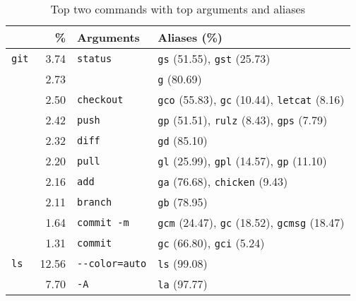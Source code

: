 \newcommand{\numx}[1]{{\small (\num{#1})}}
\begin{table}
    \caption{Top two commands with top arguments and aliases}
    \label{tab:command-summary}
    \begin{tabular}{@{}lrll@{}}
        \toprule
                       &           \% &           Arguments &                                                                    Aliases (\%) \\
        \midrule
            \verb|git| &   \num{3.74} &       \verb|status| &                               \verb|gs| \numx{51.55}, \verb|gst| \numx{25.73} \\
                       &   \num{2.73} &             \verb|| &                                                          \verb|g| \numx{80.69} \\
                       &   \num{2.50} &     \verb|checkout| &   \verb|gco| \numx{55.83}, \verb|gc| \numx{10.44}, \verb|letcat| \numx{8.16} \\
                       &   \num{2.42} &         \verb|push| &      \verb|gp| \numx{51.51}, \verb|rulz| \numx{8.43}, \verb|gps| \numx{7.79} \\
                       &   \num{2.32} &         \verb|diff| &                                                         \verb|gd| \numx{85.10} \\
                       &   \num{2.20} &         \verb|pull| &      \verb|gl| \numx{25.99}, \verb|gpl| \numx{14.57}, \verb|gp| \numx{11.10} \\
                       &   \num{2.16} &          \verb|add| &                            \verb|ga| \numx{76.68}, \verb|chicken| \numx{9.43} \\
                       &   \num{2.11} &       \verb|branch| &                                                         \verb|gb| \numx{78.95} \\
                       &   \num{1.64} &    \verb|commit -m| &   \verb|gcm| \numx{24.47}, \verb|gc| \numx{18.52}, \verb|gcmsg| \numx{18.47} \\
                       &   \num{1.31} &       \verb|commit| &                                \verb|gc| \numx{66.80}, \verb|gci| \numx{5.24} \\
        \midrule 
            \verb|ls| &  \num{12.56} & \verb|--color=auto| &                                                         \verb|ls| \numx{99.08} \\
                      &   \num{7.70} &           \verb|-A| &                                                         \verb|la| \numx{97.77} \\

\end{tabular}
\end{table}
